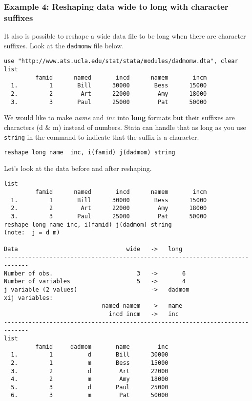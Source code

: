 \subsubsection{Example 4: Reshaping data wide to long with character suffixes}

It also is possible to reshape a wide data file to be long when there are character suffixes. Look at the \lstinline{dadmomw} file below.

\begin{lstlisting}
use "http://www.ats.ucla.edu/stat/stata/modules/dadmomw.dta", clear
list
         famid      named       incd      namem       incm
  1.         1       Bill      30000       Bess      15000
  2.         2        Art      22000        Amy      18000
  3.         3       Paul      25000        Pat      50000
\end{lstlisting}

We would like to make \textit{name} and \textit{inc} into \textbf{long} formats but their suffixes are characters (d \& m) instead of numbers. Stata can handle that as long as you use \lstinline{string} in the command to indicate that the suffix is a character.

\begin{lstlisting}
reshape long name  inc, i(famid) j(dadmom) string
\end{lstlisting}

Let's look at the data before and after reshaping.

\begin{lstlisting}
list
         famid      named       incd      namem       incm
  1.         1       Bill      30000       Bess      15000
  2.         2        Art      22000        Amy      18000
  3.         3       Paul      25000        Pat      50000
reshape long name inc, i(famid) j(dadmom) string
(note:  j = d m)

Data                               wide   ->   long
-----------------------------------------------------------------------------
Number of obs.                        3   ->       6
Number of variables                   5   ->       4
j variable (2 values)                     ->   dadmom
xij variables:
                            named namem   ->   name
                              incd incm   ->   inc
-----------------------------------------------------------------------------
list
         famid     dadmom       name        inc
  1.         1          d       Bill      30000
  2.         1          m       Bess      15000
  3.         2          d        Art      22000
  4.         2          m        Amy      18000
  5.         3          d       Paul      25000
  6.         3          m        Pat      50000
\end{lstlisting}

